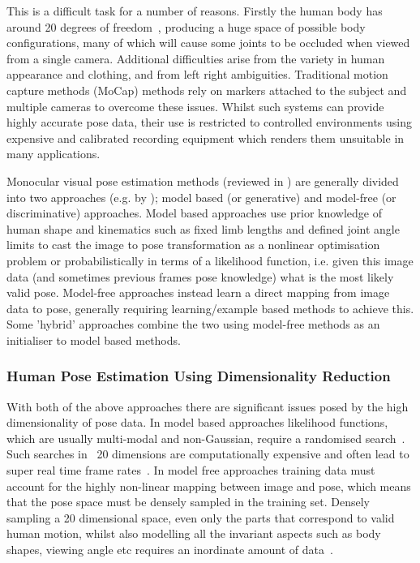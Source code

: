 \documentclass[11pt]{article} %
\begin{document}
This is a difficult task for a number of reasons. Firstly the human body has around 20 degrees of freedom~\cite{Forsyth2005}, producing a huge space of possible body configurations, many of which will cause some joints to be occluded when viewed from a single camera. Additional difficulties arise from the variety in human appearance and clothing, and from left right ambiguities. Traditional motion capture methods (MoCap) methods rely on markers attached to the subject and multiple cameras to overcome these issues. Whilst such systems can provide highly accurate pose data, their use is restricted to controlled environments using expensive and calibrated recording equipment which renders them unsuitable in many applications.

Monocular visual pose estimation methods (reviewed in \cite{Moeslund2006, Hen2009,Poppe2007,Sminchisescu2006,Liu2015}) are generally divided into two approaches (e.g. by \cite{Poppe2007}); model based (or generative) and model-free (or discriminative) approaches. Model based approaches use prior knowledge of human shape and kinematics such as fixed limb lengths and defined joint angle limits to cast the image to pose transformation as a nonlinear optimisation problem or probabilistically in terms of a likelihood function, i.e. given this image data (and sometimes previous frames pose knowledge) what is the most likely valid pose. Model-free approaches instead learn a direct mapping from image data to pose, generally requiring learning/example based methods to achieve this. Some 'hybrid' approaches combine the two using model-free methods as an initialiser to model based methods. 


\subsubsection{Human Pose Estimation Using Dimensionality Reduction}

With both of the above approaches there are significant issues posed by the high dimensionality of pose data. In model based approaches likelihood functions, which are usually multi-modal and non-Gaussian, require a randomised search~\cite{Sminchisescu2003}. Such searches in ~20 dimensions are computationally expensive and often lead to super real time frame rates~\cite{Hen2009}. In model free approaches training data must account for the highly non-linear mapping between image and pose, which means that the pose space must be densely sampled in the training set. Densely sampling a 20 dimensional space, even only the parts that correspond to valid human motion, whilst also modelling all the invariant aspects such as body shapes, viewing angle etc requires an inordinate amount of data~\cite{Hen2009,Agarwal2006}.%
\end{document}
